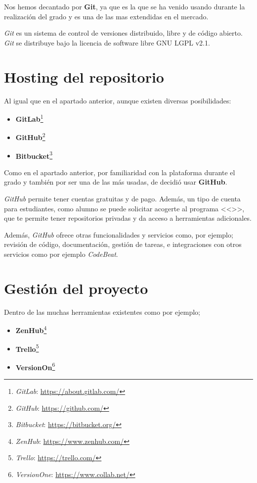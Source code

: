 Nos hemos decantado por \textbf {Git}, ya que es la que se ha venido usando durante la realización del grado y es una de las mas extendidas en el mercado.

\emph{Git} es un sistema de control de versiones distribuido, libre y de código abierto. \emph{Git} se distribuye bajo la licencia de software libre GNU LGPL v2.1. 

\section{Hosting del repositorio}

Al igual que en el apartado anterior, aunque existen diversas posibilidades:
\begin{itemize}
\item \textbf{GitLab}\footnote{\textsl{GitLab}: \url{https://about.gitlab.com/}}
\item \textbf{GitHub}\footnote{\textsl{GitHub}: \url{https://github.com/}}
\item \textbf{Bitbucket}\footnote{\textsl{Bitbucket}: \url{https://bitbucket.org/}}
\end{itemize}

Como en el apartado anterior, por familiaridad con la plataforma durante el grado y también por ser una de las más usadas, de decidió usar \textbf {GitHub}.

\emph{GitHub} permite tener cuentas gratuitas y de pago. Además, un tipo de cuenta para estudiantes, como alumno se puede solicitar acogerte al programa <<>>, que te permite tener repositorios privadas y da acceso a herramientas adicionales.

Además, \emph{GitHub} ofrece otras funcionalidades y servicios como, por ejemplo; revisión de código, documentación, gestión de tareas,  e integraciones con otros servicios como por ejemplo \emph{CodeBeat}.

\section{Gestión del proyecto}

Dentro de las muchas herramientas existentes como por ejemplo;
\begin{itemize}
\item \textbf{ZenHub}\footnote{\textsl{ZenHub}: \url{https://www.zenhub.com/}}
\item \textbf{Trello}\footnote{\textsl{Trello}: \url{https://trello.com/}}
\item \textbf{VersionOn}\footnote{\textsl{VersionOne}: \url{https://www.collab.net/}}
\end{itemize}

